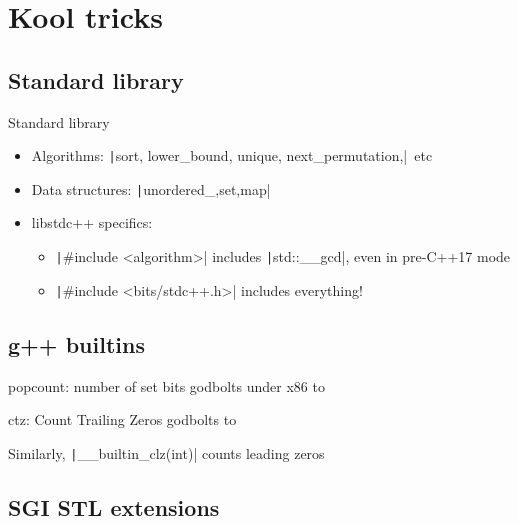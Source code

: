 \documentclass[12pt,presentation,hyperref={unicode},aspectratio=169]{beamer}
\begin{document}

\section{Kool tricks}

\subsection{Standard library}
\begin{frame}[fragile]{Standard library}
  \begin{itemize}
    \item<1-> Algorithms: \texttt|sort, lower_bound, unique, next_permutation,|~etc
    \item<1-> Data structures: \texttt|{unordered_,}{set,map}|
    \item<2-> libstdc++ specifics:
    \begin{itemize}
      \item<3-> \texttt|#include <algorithm>| includes
        \texttt|std::__gcd|, even in pre-C++17 mode
      \item<4-> \texttt|#include <bits/stdc++.h>| includes everything!
    \end{itemize}
  \end{itemize}
\end{frame}

\subsection{g++ builtins}

\begin{frame}[fragile]{popcount: number of set bits}
  godbolts under x86 to
\end{frame}

\begin{frame}[fragile]{ctz: Count Trailing Zeros}
  godbolts to

  Similarly, \texttt|__builtin_clz(int)| counts leading zeros
\end{frame}

\subsection{SGI STL extensions}
\end{document}
